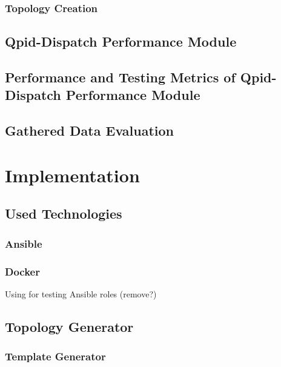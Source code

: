 \subsection{Topology Creation}

\section{Qpid-Dispatch Performance Module}

\subsection{}

\section{Performance and Testing Metrics of Qpid-Dispatch Performance Module}

\section{Gathered Data Evaluation}

\chapter{Implementation}
\label{Implementation}

\section{Used Technologies}

\subsection{Ansible}

\subsection{Docker}
Using for testing Ansible roles (remove?)

\section{Topology Generator}

\subsection{Template Generator}

